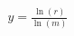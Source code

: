 \documentclass[preview]{standalone}
\begin{document}
\begin{align*}
y = \frac{\ln(r)}{\ln(m)}
\end{align*}
\end{document}
